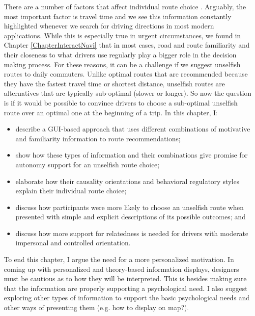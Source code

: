There are a number of factors that affect individual route choice \cite{Ben-Elia2015ResponseReview,Chorus2006TravelReview}. Arguably, the most important factor is travel time\cite{Ben-Elia2015ResponseReview} and we see this information constantly highlighted whenever we search for driving directions in most modern applications. While this is especially true in urgent circumstances, we found in Chapter \ref{ChapterInteractNavi} that in most cases, road and route familiarity and their closeness to what drivers use regularly play a bigger role in the decision making process. For these reasons, it can be a challenge if we suggest unselfish routes to daily commuters. Unlike optimal routes that are recommended because they have the fastest travel time or shortest distance, unselfish routes are alternatives that are typically sub-optimal (slower or longer). So now the question is if it would be possible to convince drivers to choose a sub-optimal unselfish route over an optimal one at the beginning of a trip. In this chapter, I:
\begin{itemize}
    \item describe a GUI-based approach that uses different combinations of motivative and familiarity information to route recommendations;
    \item show how these types of information and their combinations give promise for autonomy support for an unselfish route choice;
    \item elaborate how their causality orientations and behavioral regulatory styles explain their individual route choice; 
    \item discuss how participants were more likely to choose an unselfish route when presented with simple and explicit descriptions of its possible outcomes; and
    \item discuss how more support for relatedness is needed for drivers with moderate impersonal and controlled orientation.
\end{itemize}

To end this chapter, I argue the need for a more personalized motivation. In coming up with personalized and theory-based information displays, designers must be cautious as to how they will be interpreted. This is besides making sure that the information are properly supporting a psychological need. I also suggest exploring other types of information to support the basic psychological needs and other ways of presenting them (e.g. how to display on map?).


